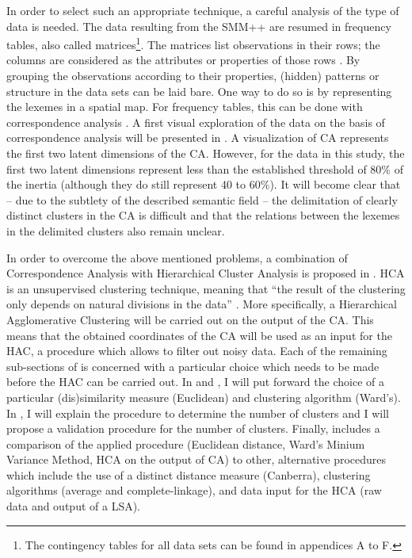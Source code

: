 In order to select such an appropriate technique, a careful analysis of the type of data is needed. The data resulting from the SMM++ are resumed in frequency tables, also called matrices\footnote{The contingency tables for all data sets can be found in appendices A to F.}. The matrices list observations in their rows; the columns are considered as the attributes or properties of those rows \citep[118]{baayen_analyzing_2008}. By grouping the observations according to their properties, (hidden) patterns or structure in the data sets can be laid bare. One way to do so is by representing the lexemes in a spatial map. For frequency tables, this can be done with correspondence analysis \citep{greenacre_correspondence_2007}. A first visual exploration of the data on the basis of correspondence analysis will be presented in . A visualization of CA represents the first two latent dimensions of the CA. However, for the data in this study, the first two latent dimensions represent less than the established threshold of 80\% of the inertia (although they do still represent 40 to 60\%). It will become clear that – due to the subtlety of the described semantic field – the delimitation of clearly distinct clusters in the CA is difficult and that the relations between the lexemes in the delimited clusters also remain unclear.

In order to overcome the above mentioned problems, a combination of Correspondence Analysis with Hierarchical Cluster Analysis is proposed in . HCA is an unsupervised clustering technique, meaning that “the result of the clustering only depends on natural divisions in the data” \citep[498]{manning_foundations_1999}. More specifically, a Hierarchical Agglomerative Clustering will be carried out on the output of the CA. This means that the obtained coordinates of the CA will be used as an input for the HAC, a procedure which allows to filter out noisy data. Each of the remaining sub-sections of  is concerned with a particular choice which needs to be made before the HAC can be carried out. In  and , I will put forward the choice of a particular (dis)similarity measure (Euclidean) and clustering algorithm (Ward’s). In , I will explain the procedure to determine the number of clusters and I will propose a validation procedure for the number of clusters. Finally,  includes a comparison of the applied procedure (Euclidean distance, Ward’s Minium Variance Method, HCA on the output of CA) to other, alternative procedures which include the use of a distinct distance measure (Canberra), clustering algorithms (average and complete-linkage), and data input for the HCA (raw data and output of a LSA).

